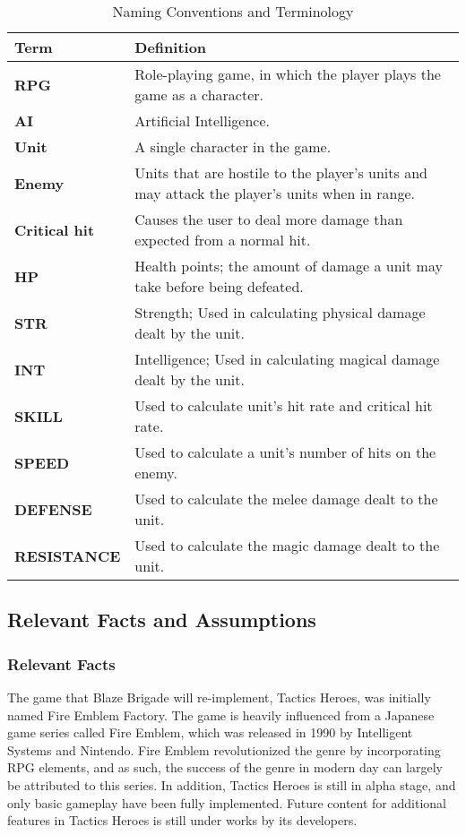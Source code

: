 \documentclass{article}
\begin{document}
\begin{table}[H]
{\renewcommand{\arraystretch}{1.4}
\begin{tabularx}{\textwidth}{lX}
    \toprule
	\textbf{Term} & \textbf{Definition} \\
	\midrule
    \textbf{RPG} & Role-playing game, in which the player plays the game as a character. \\
    \textbf{AI} & Artificial Intelligence. \\
    \textbf{Unit} & A single character in the game. \\
    \textbf{Enemy} & Units that are hostile to the player's units and may attack the player's units when in range. \\
    \textbf{Critical hit} & Causes the user to deal more damage than expected from a normal hit. \\
    \textbf{HP} & Health points; the amount of damage a unit may take before being defeated. \\
    \textbf{STR} & Strength; Used in calculating physical damage dealt by the unit. \\
    \textbf{INT} & Intelligence; Used in calculating magical damage dealt by the unit. \\
    \textbf{SKILL} & Used to calculate unit's hit rate and critical hit rate. \\
    \textbf{SPEED} & Used to calculate a unit's number of hits on the enemy. \\
    \textbf{DEFENSE} & Used to calculate the melee damage dealt to the unit. \\
    \textbf{RESISTANCE} & Used to calculate the magic damage dealt to the unit. \\
	\bottomrule
\end{tabularx}
}
\caption{Naming Conventions and Terminology}
\end{table}

\subsection{Relevant Facts and Assumptions}

\subsubsection{Relevant Facts}
The game that Blaze Brigade will re-implement, Tactics Heroes, was initially named Fire Emblem Factory. The game is heavily influenced from a Japanese game series called Fire Emblem, which was released in 1990 by Intelligent Systems and Nintendo. Fire Emblem revolutionized the genre by incorporating RPG elements, and as such, the success of the genre in modern day can largely be attributed to this series. In addition, Tactics Heroes is still in alpha stage, and only basic gameplay have been fully implemented. Future content for additional features in Tactics Heroes is still under works by its developers.
\end{document}
